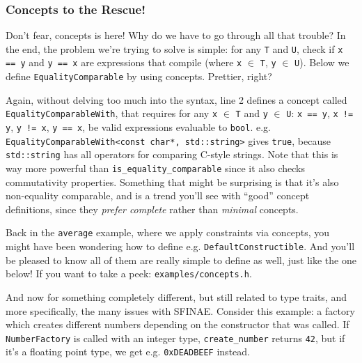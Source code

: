     

    \subsubsection*{Concepts to the Rescue!}

    Don't fear, concepts is here! Why do we have to go through all that trouble? In the end, the problem we're trying to solve is simple: for any \texttt{T} and \texttt{U}, check if \texttt{x == y} and \texttt{y == x} are expressions that compile (where \texttt{x} $\in$ \texttt{T}, \texttt{y} $\in$ \texttt{U}). Below we define \texttt{EqualityComparable} by using concepts. Prettier, right?

    Again, without delving too much into the syntax, line 2 defines a concept called \texttt{EqualityComparableWith}, that requires for any \texttt{x} $\in$ \texttt{T} and \texttt{y} $\in$ \texttt{U}: \texttt{x == y}, \texttt{x != y}, \texttt{y != x}, \texttt{y == x}, be valid expressions evaluable to \texttt{bool}. e.g. \texttt{EqualityComparableWith<const char*, std::string>} gives \texttt{true}, because \texttt{std::string} has all operators for comparing C-style strings. Note that this is way more powerful than \texttt{is\_equality\_comparable} since it also checks commutativity properties. Something that might be surprising is that it's also non-equality comparable, and is a trend you'll see with ``good'' concept definitions, since they \emph{prefer complete} rather than \emph{minimal} concepts.

    Back in the \texttt{average} example, where we apply constraints via concepts, you might have been wondering how to define e.g. \texttt{DefaultConstructible}. And you'll be pleased to know all of them are really simple to define as well, just like the one below! If you want to take a peek: \texttt{examples/concepts.h}.

    

    \noindent And now for something completely different, but still related to type traits, and more specifically, the many issues with SFINAE. Consider this example: a factory which creates different numbers depending on the constructor that was called. If \texttt{NumberFactory} is called with an integer type, \texttt{create\_number} returns \texttt{42}, but if it's a floating point type, we get e.g. \texttt{0xDEADBEEF} instead.

    


